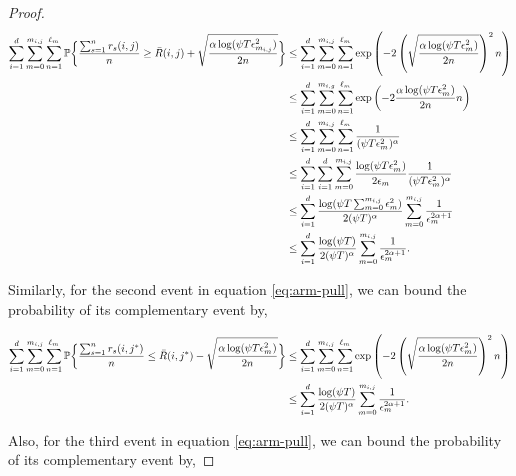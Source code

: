 \begin{proof}
\begin{align*}
\sum_{i=1}^{d}\sum_{m=0}^{m_{i,j}}\sum_{n=1}^{\ell_{m_{}}}\mathbb{P}\bigg\lbrace \dfrac{\sum_{s=1}^{n} r_{s}(i,j)}{n} \geq  \bar{R}(i,j) + \sqrt{\dfrac{\alpha\log(\psi T\epsilon_{m_{i,j}}^2)}{2n}} \bigg\rbrace & \leq \sum_{i=1}^{d}\sum_{m=0}^{m_{i,j}}\sum_{n=1}^{\ell_{m_{}}}\exp\left(-2 \left(\sqrt{\dfrac{\alpha\log(\psi T\epsilon_{m_{}}^2)}{2n}}\right)^2 n \right)\\
&\leq \sum_{i=1}^{d}\sum_{m=0}^{m_{i,g}}\sum_{n=1}^{\ell_{m_{}}}\exp\left(-2\dfrac{\alpha\log(\psi T\epsilon_{m_{}}^2)}{2n}n \right)\\
&\leq \sum_{i=1}^{d}\sum_{m=0}^{m_{i,j}}\sum_{n=1}^{\ell_{m_{}}}\dfrac{1}{(\psi T\epsilon_{m_{}}^2)^{\alpha}} \\
&\leq \sum_{i=1}^{d}\sum_{i=1}^{d}\sum_{m=0}^{m_{i,j}}\dfrac{\log(\psi T\epsilon_{m_{}}^2)}{2\epsilon_{m_{}}}\dfrac{1}{(\psi T\epsilon_{m_{}}^2)^{\alpha}} \\
&\leq \sum_{i=1}^{d} \dfrac{\log(\psi T  \sum_{m=0}^{m_{i,j}}\epsilon_{m}^2)}{2(\psi T)^{\alpha}}\sum_{m=0}^{m_{i,j}}\dfrac{1}{\epsilon_{m_{}}^{2\alpha +1}} \\
&\leq \sum_{i=1}^{d}\dfrac{\log(\psi T)}{2(\psi T)^{\alpha}}\sum_{m=0}^{m_{i,j}}\dfrac{1}{\epsilon_{m_{}}^{2\alpha +1}}.
\end{align*}

Similarly, for the second event in equation \ref{eq:arm-pull}, we can bound the probability of its complementary event by,

\begin{align*}
\sum_{i=1}^{d}\sum_{m=0}^{m_{i,j}}\sum_{n =1}^{\ell_{m_{}}}\mathbb{P}\bigg\lbrace \dfrac{\sum_{s=1}^{n} r_{s}(i,j^*)}{n} \leq \bar{R}(i,j^*) - \sqrt{\dfrac{\alpha\log(\psi T\epsilon_{m_{}}^2)}{2n}} \bigg\rbrace &\leq \sum_{i=1}^{d}\sum_{m=0}^{m_{i,j}}\sum_{n=1}^{\ell_{m_{}}}\exp\left(-2\left(\sqrt{\dfrac{\alpha\log(\psi T\epsilon_{m_{}}^2)}{2n}}\right)^2n_{} \right)\\
&\leq \sum_{i=1}^{d}\dfrac{\log(\psi T )}{2(\psi T)^{\alpha}}\sum_{m=0}^{m_{i,j}}\dfrac{1}{\epsilon_{m_{}}^{2\alpha +1}}.
\end{align*}


Also, for the third event in equation \ref{eq:arm-pull}, we can bound the probability of its complementary event by,


\end{proof}
